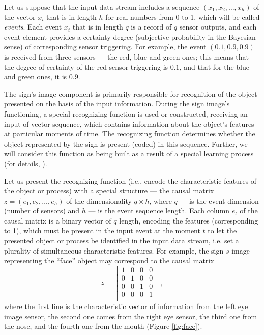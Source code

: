 \documentclass[review]{elsarticle}
\begin{document}
Let us suppose that the input data stream includes a sequence $(x_1,x_2,\dots,x_h)$ of the vector $x_i$ that is in length $h$ for real numbers from 0 to 1, which will be called \textit{events}. Each event $x_t$ that is in length $q$ is a record of $q$ sensor outputs, and each event element provides a certainty degree (subjective probability in the Bayesian sense) of corresponding sensor triggering. For example, the event $(0.1, 0.9, 0.9)$ is received from three sensors --- the red, blue and green ones; this means that the degree of certainty of the red sensor triggering is  $0.1$, and that for the blue and green ones, it is $0.9$.

The sign's image component is primarily responsible for recognition of the object presented on the basis of the input information. During the sign image's functioning, a special recognizing function is used or constructed, receiving an input of vector sequence, which contains information about the object’s features at particular moments of time. The recognizing function determines whether the object represented by the sign is present (coded) in this sequence. Further, we will consider this function as being built as a result of a special learning process (for details, \cite{Skrynnik2016}).


Let us present the recognizing function (i.e., encode the characteristic features of the object or process) with a special structure --- the causal matrix $z=(e_1,e_2,\dots,e_h)$ of the dimensionality $q\times h$, where $q$ --- is the event dimension (number of sensors) and $h$ --- is the event sequence length. Each column $e_t$ of the causal matrix is a binary vector of $q$ length, encoding the features (corresponding to 1), which must be present in the input event at the moment $t$ to let the presented object or process be identified in the input data stream, i.e. set a plurality of simultaneous characteristic features. For example, the sign $s$ image representing the ``face'' object  may correspond to the causal matrix
\[
z=\begin{bmatrix}
1 & 0 & 0 & 0\\
0 & 1 & 0 & 0\\
0 & 0 & 1 & 0\\
0 & 0 & 0 & 1\\
\end{bmatrix},
\]
where the first line is the characteristic vector of information from the left eye image sensor, the second one comes from the right eye sensor, the third one from the nose, and the fourth one from the mouth (Figure \ref{fig:face}).	
\end{document}
